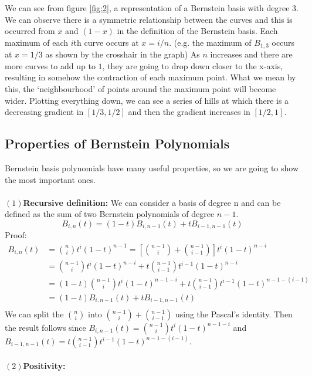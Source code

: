 \documentclass{article}
\begin{document}
\newpage
We can see from figure \ref{fig:2}, a representation of a Bernstein basis with degree $3$. We can observe there is a symmetric relationship between the curves and this is occurred from $x$ and $(1-x)$ in the definition of the Bernstein basis. Each maximum of each $i$th curve occurs at $x=i/n$. (e.g. the maximum of $B_{1,3}$ occurs at $x=1/3$ as shown by the crosshair in the graph) As $n$ increases and there are more curves to add up to $1$, they are going to drop down closer to the x-axis, resulting in somehow the contraction of each maximum point. What we mean by this, the `neighbourhood' of points around the maximum point will become wider. Plotting everything down, we can see a series of hills at which there is a decreasing gradient in $[1/3, 1/2]$ and then the gradient increases in $[1/2, 1]$.
\subsection{Properties of Bernstein Polynomials}
Bernstein basis polynomials have many useful properties, so we are going to show the most important ones.\paragraph{}
$(1)$\textbf{Recursive definition:}
We can consider a basis of degree n and can be defined as the sum of two Bernstein polynomials of degree $n-1$.
\begin{equation*}
B_{i,n}(t)=(1-t)B_{i,n-1}(t)+tB_{i-1,n-1}(t)    
\end{equation*}
Proof:
\begin{align*}
B_{i,n}(t)&=\binom{n}{i}t^i(1-t)^{n-1}=\left[\binom{n-1}{i}+\binom{n-1}{i-1}\right]t^i(1-t)^{n-i}\\
&=\binom{n-1}{i}t^i(1-t)^{n-i}+t\binom{n-1}{i-1}t^{i-1}(1-t)^{n-i}\\
&=(1-t)\binom{n-1}{i}t^i(1-t)^{n-1-i}+t\binom{n-1}{i-1}t^{i-1}(1-t)^{n-1-(i-1)}\\
&=(1-t)B_{i,n-1}(t)+tB_{i-1,n-1}(t)\\
\end{align*}
We can split the $\binom{n}{i}$ into $\binom{n-1}{i}+\binom{n-1}{i-1}$ using the Pascal’s identity. Then the result follows since $B_{i,n-1}(t)=\binom{n-1}{i}t^i(1-t)^{n-1-i}$ and $B_{i-1,n-1}(t)=t\binom{n-1}{i-1}t^{i-1}(1-t)^{n-1-(i-1)}$.\paragraph{}
$(2)$\textbf{Positivity:}
\end{document}
